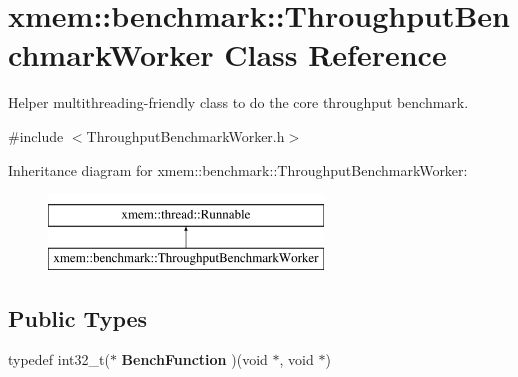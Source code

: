 \hypertarget{classxmem_1_1benchmark_1_1_throughput_benchmark_worker}{\section{xmem\-:\-:benchmark\-:\-:Throughput\-Benchmark\-Worker Class Reference}
\label{classxmem_1_1benchmark_1_1_throughput_benchmark_worker}
}


Helper multithreading-\/friendly class to do the core throughput benchmark.  




{\ttfamily \#include $<$Throughput\-Benchmark\-Worker.\-h$>$}

Inheritance diagram for xmem\-:\-:benchmark\-:\-:Throughput\-Benchmark\-Worker\-:\begin{figure}[H]
\begin{center}
\leavevmode
\includegraphics[height=2.000000cm]{classxmem_1_1benchmark_1_1_throughput_benchmark_worker}
\end{center}
\end{figure}
\subsection*{Public Types}
\begin{DoxyCompactItemize}
\item 
\hypertarget{classxmem_1_1benchmark_1_1_throughput_benchmark_worker_ae94fcc9ea97a599065ef51d864f392c5}{typedef int32\-\_\-t($\ast$ {\bfseries Bench\-Function} )(void $\ast$, void $\ast$)}\label{classxmem_1_1benchmark_1_1_throughput_benchmark_worker_ae94fcc9ea97a599065ef51d864f392c5}

\end{DoxyCompactItemize}
